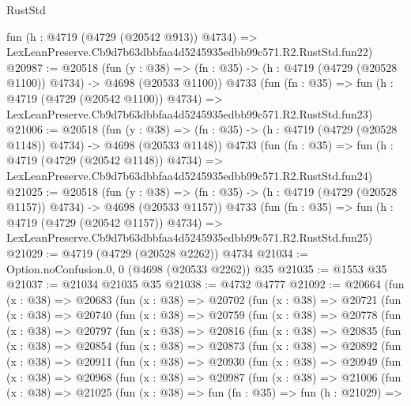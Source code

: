 \begin{lexlean}{RustStd}
\begin{coremodule}
    fun (h : @4719 (@4729 (@20542 @913)) @4734) =>
    LexLeanPreserve.Cb9d7b63dbbfaa4d5245935edbb99c571.R2.RustStd.fun22)
@20987 := @20518
    (fun (y : @38) =>
    (fn : @35) -> (h : @4719 (@4729 (@20528 @1100)) @4734) -> @4698 (@20533 @1100))
    @4733
    (fun (fn : @35) =>
    fun (h : @4719 (@4729 (@20542 @1100)) @4734) =>
    LexLeanPreserve.Cb9d7b63dbbfaa4d5245935edbb99c571.R2.RustStd.fun23)
@21006 := @20518
    (fun (y : @38) =>
    (fn : @35) -> (h : @4719 (@4729 (@20528 @1148)) @4734) -> @4698 (@20533 @1148))
    @4733
    (fun (fn : @35) =>
    fun (h : @4719 (@4729 (@20542 @1148)) @4734) =>
    LexLeanPreserve.Cb9d7b63dbbfaa4d5245935edbb99c571.R2.RustStd.fun24)
@21025 := @20518
    (fun (y : @38) =>
    (fn : @35) -> (h : @4719 (@4729 (@20528 @1157)) @4734) -> @4698 (@20533 @1157))
    @4733
    (fun (fn : @35) =>
    fun (h : @4719 (@4729 (@20542 @1157)) @4734) =>
    LexLeanPreserve.Cb9d7b63dbbfaa4d5245935edbb99c571.R2.RustStd.fun25)
@21029 := @4719 (@4729 (@20528 @2262)) @4734
@21034 := Option.noConfusion.{0, 0} (@4698 (@20533 @2262)) @35
@21035 := @1553 @35
@21037 := @21034 @21035 @35
@21038 := @4732 @4777
@21092 := @20664
    (fun (x : @38) =>
    @20683
      (fun (x : @38) =>
      @20702
        (fun (x : @38) =>
        @20721
          (fun (x : @38) =>
          @20740
            (fun (x : @38) =>
            @20759
              (fun (x : @38) =>
              @20778
                (fun (x : @38) =>
                @20797
                  (fun (x : @38) =>
                  @20816
                    (fun (x : @38) =>
                    @20835
                      (fun (x : @38) =>
                      @20854
                        (fun (x : @38) =>
                        @20873
                          (fun (x : @38) =>
                          @20892
                            (fun (x : @38) =>
                            @20911
                              (fun (x : @38) =>
                              @20930
                                (fun (x : @38) =>
                                @20949
                                  (fun (x : @38) =>
                                  @20968
                                    (fun (x : @38) =>
                                    @20987
                                      (fun (x : @38) =>
                                      @21006
                                        (fun (x : @38) =>
                                        @21025
                                          (fun (x : @38) =>
                                          fun (fn : @35) =>
                                          fun (h : @21029) =>

\end{coremodule}
\end{lexlean}
